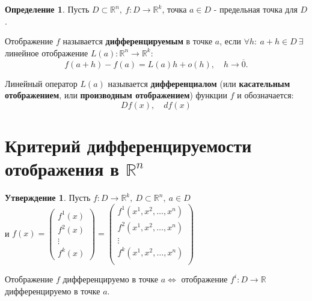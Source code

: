 \documentclass{report}
\theoremstyle{definition}
\newtheorem*{definition}{Определение}
\newtheorem*{statement}{Утверждение}
\begin{document}
\begin{definition}
    Пусть $D \subset \mathbb{R}^n, \ f:D\rightarrow\mathbb{R}^k$, точка $a\in D$ - предельная точка для $D$.

    Отображение $f$ называется \textbf{дифференцируемым} в точке $a$, если $\forall h: \ a+h \in D \ \exists$
    линейное отображение $L(a):\mathbb{R}^n\rightarrow\mathbb{R}^k:$
    \begin{equation*}
        f(a+h) - f(a) = L(a)h + o(h), \quad h\rightarrow\overline{0}.
    \end{equation*}

    Линейный оператор $L(a)$ называется \textbf{дифференциалом} (или \textbf{касательным отображением}, или
    \textbf{производным отображением}) функции $f$ и обозначается:
    \begin{equation*}
        Df(x), \quad df(x)
    \end{equation*}
\end{definition}

\section{Критерий дифференцируемости отображения в $\mathbb{R}^n$}

\begin{statement}
    Пусть $f:D\rightarrow\mathbb{R}^k, \ D \subset \mathbb{R}^n, \ a \in D$ \\ и $f(x) = \left(
        \begin{array}{c}
                f^1(x) \\
                f^2(x) \\
                \vdots \\
                f^k(x)
            \end{array}
        \right) = \left(
        \begin{array}{c}
                f^1(x^1,x^2,\ldots,x^n) \\
                f^2(x^1,x^2,\ldots,x^n) \\
                \vdots                  \\
                f^k(x^1,x^2,\ldots,x^n) \\
            \end{array}
        \right)$

    Отображение $f$ дифференцируемо в точке $a \iff$ отображение $f^i: D \rightarrow \mathbb{R}$ дифференцируемо
    в точке $a$.
\end{statement}
\end{document}
